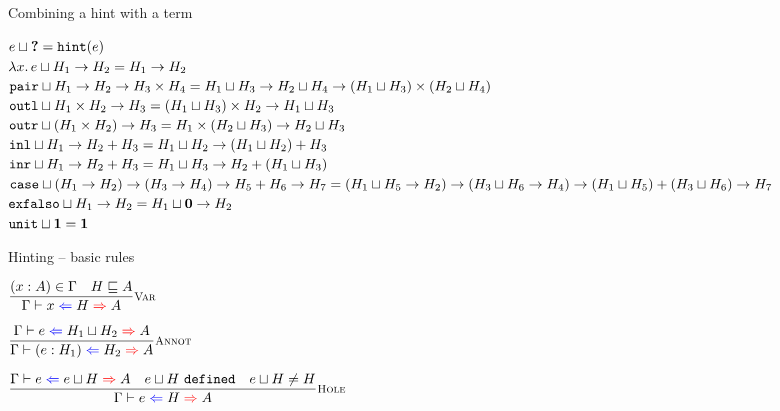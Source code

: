 \documentclass{beamer}
\begin{document}
\begin{frame}{Combining a hint with a term}

\begin{center}
  $e \sqcup \textbf{?} = \texttt{hint}(e)$ \\
  $\lambda x.\, e \sqcup H_1 \to H_2 = H_1 \to H_2$ \\
  $\texttt{pair} \sqcup H_1 \to H_2 \to H_3 \times H_4 = H_1 \sqcup H_3 \to H_2 \sqcup H_4 \to (H_1 \sqcup H_3) \times (H_2 \sqcup H_4)$ \\
  $\texttt{outl} \sqcup H_1 \times H_2 \to H_3 = (H_1 \sqcup H_3) \times H_2 \to H_1 \sqcup H_3$ \\
  $\texttt{outr} \sqcup (H_1 \times H_2) \to H_3 = H_1 \times (H_2 \sqcup H_3) \to H_2 \sqcup H_3$ \\
  $\texttt{inl} \sqcup H_1 \to H_2 + H_3 = H_1 \sqcup H_2 \to (H_1 \sqcup H_2) + H_3$ \\
  $\texttt{inr} \sqcup H_1 \to H_2 + H_3 = H_1 \sqcup H_3 \to H_2 + (H_1 \sqcup H_3)$ \\
  $\texttt{case} \sqcup (H_1 \to H_2) \to (H_3 \to H_4) \to H_5 + H_6 \to H_7 = (H_1 \sqcup H_5 \to H_2) \to (H_3 \sqcup H_6 \to H_4) \to (H_1 \sqcup H_5) + (H_3 \sqcup H_6) \to H_7$ \\
  $\texttt{exfalso} \sqcup H_1 \to H_2 = H_1 \sqcup \textbf{0} \to H_2$ \\
  $\texttt{unit} \sqcup \textbf{1} = \textbf{1}$
\end{center}

\end{frame}

\begin{frame}{Hinting -- basic rules}

\begin{center}
  $\infrule[Var]{\sidecond{(x : A) \in \Gamma} \quad \sidecond{\hintorder{H}{A}}}{\hinting{x}{H}{A}}$

  \vspace{2em}

  $\infrule[Annot]{\hinting{e}{\hintlub{H_1}{H_2}}{A}}{\hinting{\annot{e}{H_1}}{H_2}{A}}$

  \vspace{2em}

  $\infrule[Hole]{\hinting{e}{\hintlub{e}{H}}{A} \quad \sidecond{\hintlub{e}{H}\ \texttt{defined}} \quad \sidecond{\hintlub{e}{H} \neq H}}{\hinting{e}{H}{A}}$
\end{center}

\vspace{2em}

\end{frame}
\end{document}
